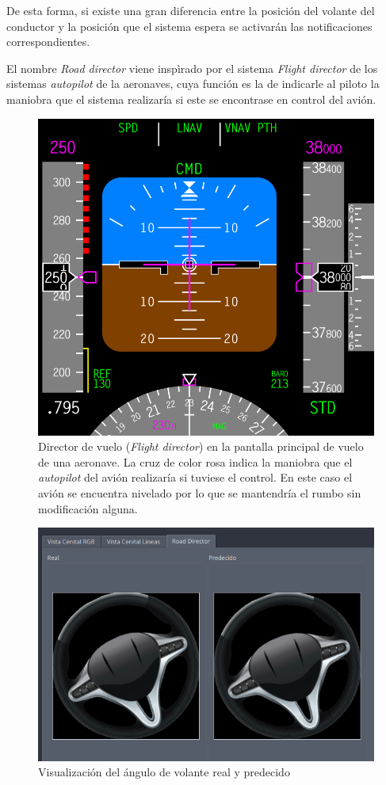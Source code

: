 De esta forma, si existe una gran diferencia entre la posición del volante del conductor y la posición que el sistema espera se activarán las notificaciones correspondientes.

El nombre \textit{Road director} viene inspìrado por el sistema \textit{Flight director} de los sistemas \textit{autopilot} de la aeronaves, cuya función es la de indicarle al piloto la maniobra que el sistema realizaría si este se encontrase en control del avión.

\begin{figure}[h]
    \centering
    \includegraphics[width=0.5\linewidth]{img/FlightDirector.png}
    \caption[El director de vuelo (\textit{Flight director}) en la pantalla principal de vuelo de una aeronave]{Director de vuelo (\textit{Flight director}) en la pantalla principal de vuelo de una aeronave. La cruz de color rosa indica la maniobra que el \textit{autopilot} del avión realizaría si tuviese el control. En este caso el avión se encuentra nivelado por lo que se mantendría el rumbo sin modificación alguna.}
    \label{fig:flightDirector}
\end{figure}
\begin{figure}[h!]
    \centering
    \includegraphics[width=0.8\linewidth]{img/rdwheel.png}
    \caption{Visualización del ángulo de volante real y predecido}
    \label{fig:rdwheel}    
\end{figure}


